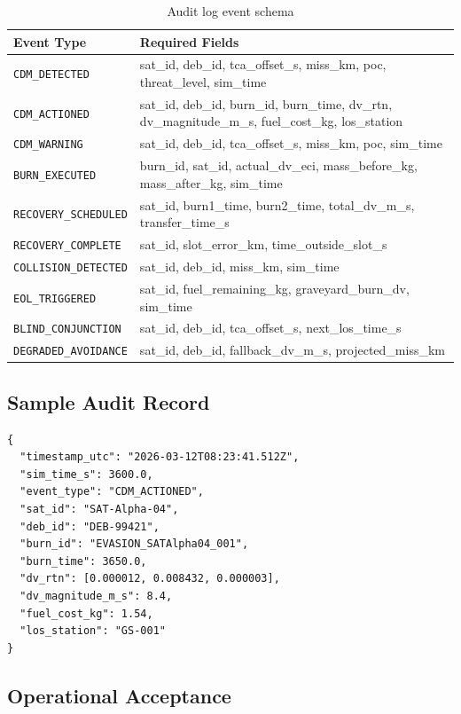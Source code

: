 \documentclass[12pt,a4paper]{article}
\begin{document}
\begin{table}[H]
\centering
\caption{Audit log event schema}
\begin{tabular}{lp{7cm}}
\toprule
\textbf{Event Type} & \textbf{Required Fields} \\
\midrule
\texttt{CDM\_DETECTED} & sat\_id, deb\_id, tca\_offset\_s, miss\_km, poc, threat\_level, sim\_time \\
\texttt{CDM\_ACTIONED} & sat\_id, deb\_id, burn\_id, burn\_time, dv\_rtn, dv\_magnitude\_m\_s, fuel\_cost\_kg, los\_station \\
\texttt{CDM\_WARNING} & sat\_id, deb\_id, tca\_offset\_s, miss\_km, poc, sim\_time \\
\texttt{BURN\_EXECUTED} & burn\_id, sat\_id, actual\_dv\_eci, mass\_before\_kg, mass\_after\_kg, sim\_time \\
\texttt{RECOVERY\_SCHEDULED} & sat\_id, burn1\_time, burn2\_time, total\_dv\_m\_s, transfer\_time\_s \\
\texttt{RECOVERY\_COMPLETE} & sat\_id, slot\_error\_km, time\_outside\_slot\_s \\
\texttt{COLLISION\_DETECTED} & sat\_id, deb\_id, miss\_km, sim\_time \\
\texttt{EOL\_TRIGGERED} & sat\_id, fuel\_remaining\_kg, graveyard\_burn\_dv, sim\_time \\
\texttt{BLIND\_CONJUNCTION} & sat\_id, deb\_id, tca\_offset\_s, next\_los\_time\_s \\
\texttt{DEGRADED\_AVOIDANCE} & sat\_id, deb\_id, fallback\_dv\_m\_s, projected\_miss\_km \\
\bottomrule
\end{tabular}
\end{table}

\subsection{Sample Audit Record}

\begin{lstlisting}[caption={Sample CDM\_ACTIONED log entry}]
{
  "timestamp_utc": "2026-03-12T08:23:41.512Z",
  "sim_time_s": 3600.0,
  "event_type": "CDM_ACTIONED",
  "sat_id": "SAT-Alpha-04",
  "deb_id": "DEB-99421",
  "burn_id": "EVASION_SATAlpha04_001",
  "burn_time": 3650.0,
  "dv_rtn": [0.000012, 0.008432, 0.000003],
  "dv_magnitude_m_s": 8.4,
  "fuel_cost_kg": 1.54,
  "los_station": "GS-001"
}
\end{lstlisting}

\subsection{Operational Acceptance}
\end{document}
